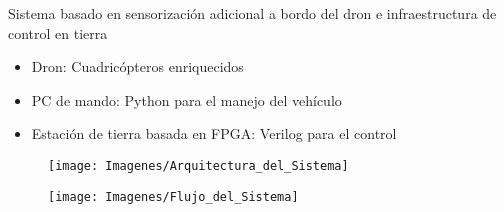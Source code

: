 \documentclass[a4,landscpae]{seminar}
\begin{document}
\begin{hslide}
Sistema basado en sensorizaci\'on adicional a bordo del dron e infraestructura de control en tierra\\

\begin{minipage}{4.5cm}
	\begin{itemize}
		\item Dron: Cuadric\'opteros enriquecidos
	\end{itemize}
	\begin{itemize}
		\item PC de mando: Python para el manejo del veh\'iculo
		\item Estaci\'on de tierra basada en FPGA: Verilog para el control
	\end{itemize}
\end{minipage} \hfill
\begin{minipage}{6cm}
	\begin{figure}
		\texttt{[image: Imagenes/Arquitectura\_del\_Sistema]}
	\end{figure}
\end{minipage} \hfill
\end{hslide}
\begin{hslide}
\begin{center}
	\begin{figure}[h]
		\texttt{[image: Imagenes/Flujo\_del\_Sistema]}
	\end{figure}
\end{center}
\end{hslide}
\begin{hslide}

\end{hslide}
\begin{hslide}

\end{hslide}
\begin{hslide}

\end{hslide}
\end{document}
